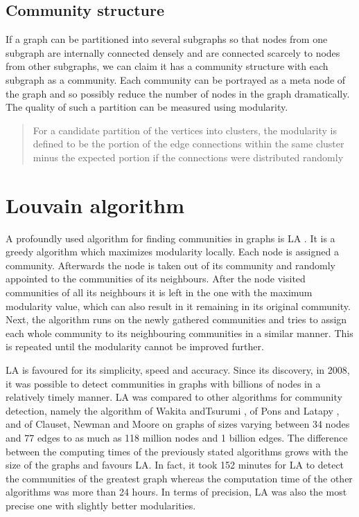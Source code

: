 \subsection{Community structure}
If a graph can be partitioned into several subgraphs so that nodes from one subgraph are internally connected densely and are connected scarcely to nodes from other subgraphs, we can claim it has a  community structure with each subgraph as a community. \cite{communitiesOverview} Each community can be portrayed as a meta node of the graph and so possibly reduce the number of nodes in the graph dramatically. The quality of such a partition can be measured using modularity. \cite{modularityOverview} \begin{quotation}  For a candidate partition of the vertices into clusters, the modularity is defined to be the portion of the edge connections within the same cluster minus the expected portion if the connections were distributed randomly \end{quotation} \cite{modularityDefinition}

\section{Louvain algorithm} \label{louvainAlgorithm}
A profoundly used algorithm for finding communities in graphs is LA \cite{louvainAlgorithm}. It is a greedy algorithm which maximizes modularity locally. Each node is assigned a community. Afterwards the node is taken out of its community and randomly appointed to the communities of its neighbours. After the node visited communities of all its neighbours it is left in the one with the maximum modularity value, which can also result in it remaining in its original community. Next, the algorithm runs on the newly gathered communities and tries to assign each whole community to its neighbouring communities in a similar manner. This is repeated until the modularity cannot be improved further.

LA is favoured for its simplicity, speed and accuracy. Since its discovery, in 2008, it was possible to detect communities in graphs with billions of nodes in a relatively timely manner. LA was compared to other algorithms for community detection, namely the algorithm of Wakita andTsurumi \cite{wakitaAndToshiyuki}, of Pons and Latapy \cite{ponsAndLatapy}, and of Clauset, Newman and Moore \cite{CNM} on graphs of sizes varying between 34 nodes and 77 edges to as much as 118 million nodes and 1 billion edges. The difference between the computing times of the previously stated algorithms grows with the size of the graphs and favours LA. In fact, it took 152 minutes for LA to detect the communities of the greatest graph whereas the computation time of the other algorithms was more than 24 hours. In terms of precision, LA was also the most precise one with slightly better modularities.

